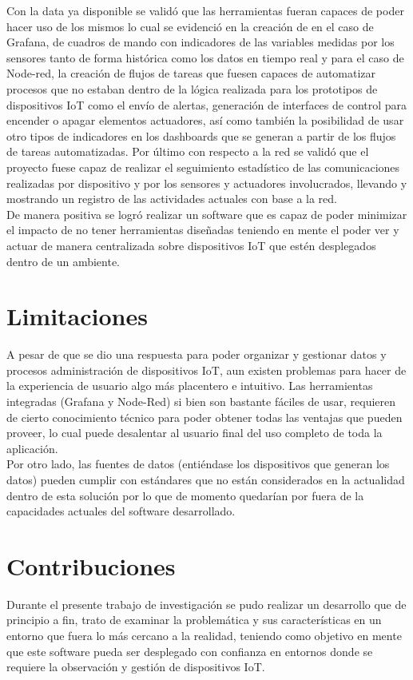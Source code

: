 Con la data ya disponible se validó que las herramientas fueran capaces de poder hacer uso de los mismos lo cual se evidenció en la creación de en el caso de Grafana, de cuadros de mando con indicadores de las variables medidas por los sensores tanto de forma histórica como los datos en tiempo real y para el caso de Node-red, la creación de flujos de tareas que fuesen capaces de automatizar procesos que no estaban dentro de la lógica realizada para los prototipos de dispositivos IoT como el envío de alertas, generación de interfaces de control para encender o apagar elementos actuadores, así como también la posibilidad de usar otro tipos de indicadores en los dashboards que se generan a partir de los flujos de tareas automatizadas. Por último con respecto a la red se validó que el proyecto fuese capaz de realizar el seguimiento estadístico de las comunicaciones realizadas por dispositivo y por los sensores y actuadores involucrados, llevando y mostrando un registro de las actividades actuales con base a la red.\\

De manera positiva se logró realizar un software que es capaz de poder minimizar el impacto de no tener herramientas diseñadas teniendo en mente el poder ver y actuar de manera centralizada sobre dispositivos IoT que estén desplegados dentro de un ambiente.

\section{Limitaciones}
A pesar de que se dio una respuesta para poder organizar y gestionar datos y procesos administración de dispositivos IoT, aun existen problemas para hacer de la experiencia de usuario algo más placentero e intuitivo. Las herramientas integradas (Grafana y Node-Red) si bien son bastante fáciles de usar, requieren de cierto conocimiento técnico para poder obtener todas las ventajas que pueden proveer, lo cual puede desalentar al usuario final del uso completo de toda la aplicación.\\

Por otro lado, las fuentes de datos (entiéndase los dispositivos que generan los datos) pueden cumplir con estándares que no están considerados en la actualidad dentro de esta solución por lo que de momento quedarían por fuera de la capacidades actuales del software desarrollado.

\section{Contribuciones}
Durante el presente trabajo de investigación se pudo realizar un desarrollo que de principio a fin, trato de examinar la problemática y sus características en un entorno que fuera lo más cercano a la realidad, teniendo como objetivo en mente que este software pueda ser desplegado con confianza en entornos donde se requiere la observación y gestión de dispositivos IoT.\\

